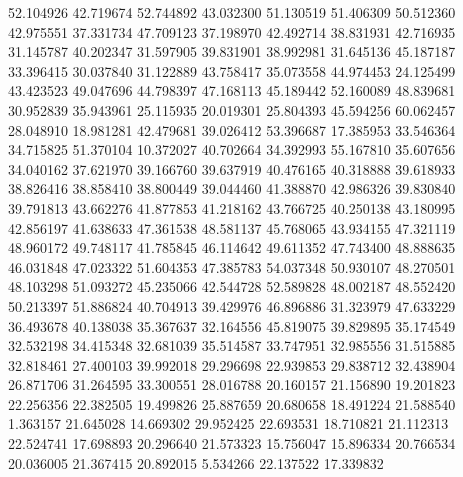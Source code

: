 52.104926
42.719674
52.744892
43.032300
51.130519
51.406309
50.512360
42.975551
37.331734
47.709123
37.198970
42.492714
38.831931
42.716935
31.145787
40.202347
31.597905
39.831901
38.992981
31.645136
45.187187
33.396415
30.037840
31.122889
43.758417
35.073558
44.974453
24.125499
43.423523
49.047696
44.798397
47.168113
45.189442
52.160089
48.839681
30.952839
35.943961
25.115935
20.019301
25.804393
45.594256
60.062457
28.048910
18.981281
42.479681
39.026412
53.396687
17.385953
33.546364
34.715825
51.370104
10.372027
40.702664
34.392993
55.167810
35.607656
34.040162
37.621970
39.166760
39.637919
40.476165
40.318888
39.618933
38.826416
38.858410
38.800449
39.044460
41.388870
42.986326
39.830840
39.791813
43.662276
41.877853
41.218162
43.766725
40.250138
43.180995
42.856197
41.638633
47.361538
48.581137
45.768065
43.934155
47.321119
48.960172
49.748117
41.785845
46.114642
49.611352
47.743400
48.888635
46.031848
47.023322
51.604353
47.385783
54.037348
50.930107
48.270501
48.103298
51.093272
45.235066
42.544728
52.589828
48.002187
48.552420
50.213397
51.886824
40.704913
39.429976
46.896886
31.323979
47.633229
36.493678
40.138038
35.367637
32.164556
45.819075
39.829895
35.174549
32.532198
34.415348
32.681039
35.514587
33.747951
32.985556
31.515885
32.818461
27.400103
39.992018
29.296698
22.939853
29.838712
32.438904
26.871706
31.264595
33.300551
28.016788
20.160157
21.156890
19.201823
22.256356
22.382505
19.499826
25.887659
20.680658
18.491224
21.588540
1.363157
21.645028
14.669302
29.952425
22.693531
18.710821
21.112313
22.524741
17.698893
20.296640
21.573323
15.756047
15.896334
20.766534
20.036005
21.367415
20.892015
5.534266
22.137522
17.339832
